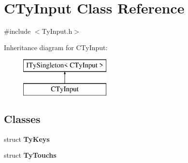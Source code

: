 \hypertarget{class_c_ty_input}{
\section{CTyInput Class Reference}
\label{class_c_ty_input}
}


{\ttfamily \#include $<$TyInput.h$>$}

Inheritance diagram for CTyInput:\begin{figure}[H]
\begin{center}
\leavevmode
\includegraphics[height=2.000000cm]{class_c_ty_input}
\end{center}
\end{figure}
\subsection*{Classes}
\begin{DoxyCompactItemize}
\item 
struct {\bfseries TyKeys}
\item 
struct {\bfseries TyTouchs}
\end{DoxyCompactItemize}
